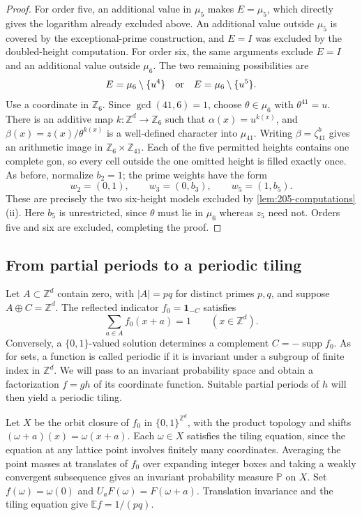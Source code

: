 \documentclass[11pt,reqno]{amsart}
\newcommand{\Z}{\mathbb Z}
\newcommand{\E}{\mathbb E}
\newcommand{\one}{\mathbf 1}
\newcommand{\supp}{\operatorname{supp}}
\theoremstyle{definition}
\theoremstyle{remark}
\numberwithin{equation}{section}
\begin{document}
\begin{proof}
For order five, an additional value in $\mu_5$ makes $E=\mu_5$,
which directly gives the logarithm already excluded above. An additional
value outside $\mu_5$ is covered by the exceptional-prime construction,
and $E=I$ was excluded by the doubled-height computation.
For order six, the same arguments exclude $E=I$ and an additional
value outside $\mu_6$. The two remaining possibilities are
\[
 E=\mu_6\setminus\{u^4\}
 \quad\hbox{or}\quad E=\mu_6\setminus\{u^5\}.
\]
Use a coordinate in $\Z_6$. Since $\gcd(41,6)=1$, choose
$\theta\in\mu_6$ with
$\theta^{41}=u$. There is an additive map
$k:\Z^d\to\Z_6$ such that $\alpha(x)=u^{k(x)}$, and
$\beta(x)=z(x)/\theta^{k(x)}$ is a well-defined character into
$\mu_{41}$. Writing $\beta=\zeta_{41}^b$ gives an arithmetic image
in $\Z_6\times\Z_{41}$. Each of the five permitted heights contains
one complete gon, so every cell outside the one omitted height is
filled exactly once. As before, normalize $b_2=1$; the prime weights
have the form
\[
 w_2=(0,1),\qquad w_3=(0,b_3),\qquad w_5=(1,b_5).
\]
These are precisely the two six-height models excluded by
\cref{lem:205-computations}(ii). Here $b_5$ is unrestricted, since
$\theta$ must lie in $\mu_6$ whereas $z_5$ need not.
Orders five and six are excluded, completing the proof.
\end{proof}

\subsection{From partial periods to a periodic tiling}\label{sec:periodic-replacement}

Let $A\subset\Z^d$ contain zero, with $|A|=pq$ for distinct primes
$p,q$, and suppose $A\oplus C=\Z^d$. The reflected indicator
$f_0=\one_{-C}$ satisfies
\begin{equation}\label{eq:cotiler}
 \sum_{a\in A}f_0(x+a)=1\qquad(x\in\Z^d).
\end{equation}
Conversely, a $\{0,1\}$-valued solution determines a complement
$C=-\supp f_0$. As for sets, a function is called periodic if it is
invariant under a subgroup of finite index in $\Z^d$.
We will pass to an invariant probability space and obtain a
factorization $f=gh$ of its coordinate function. Suitable partial
periods of $h$ will then yield a periodic tiling.

Let $X$ be the orbit closure of $f_0$ in $\{0,1\}^{\Z^d}$, with
the product topology and shifts
$(\omega+a)(x)=\omega(x+a)$. Each $\omega\in X$ satisfies the tiling
equation, since the equation at any lattice point involves finitely
many coordinates. Averaging the point masses at translates of $f_0$
over expanding integer boxes and taking a weakly convergent subsequence
gives an invariant probability measure $\mathbb P$ on $X$.
Set $f(\omega)=\omega(0)$ and
$U_aF(\omega)=F(\omega+a)$. Translation invariance and the tiling
equation give $\E f=1/(pq)$.
\end{document}
